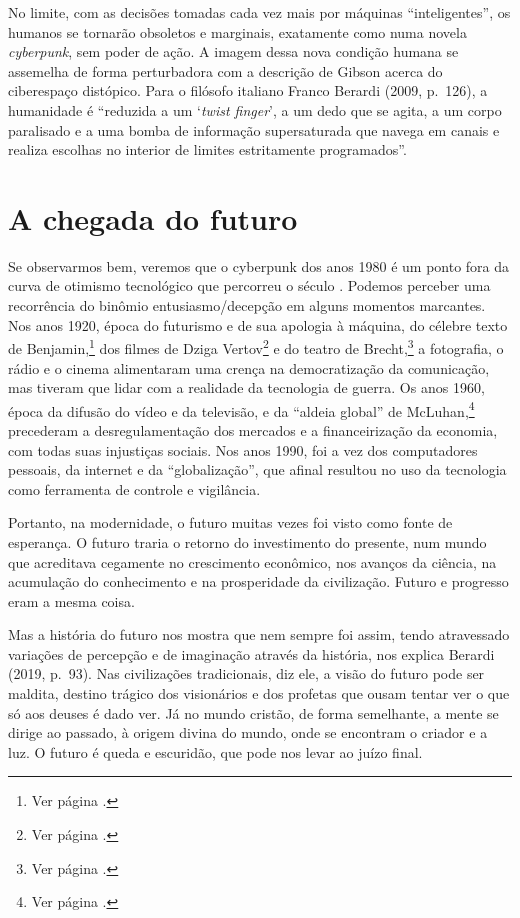 No limite, com as decisões tomadas cada vez mais por máquinas
``inteligentes'', os humanos se tornarão obsoletos e marginais,
exatamente como numa novela \emph{cyberpunk}, sem poder de ação. A imagem dessa
nova condição humana se assemelha de forma perturbadora com a descrição
de Gibson acerca do ciberespaço distópico. Para o filósofo italiano
Franco Berardi (2009, p.~126), a humanidade é ``reduzida a um `\emph{twist finger}', a um dedo que se agita, a um corpo paralisado e a uma bomba de
informação supersaturada que navega em canais e realiza escolhas no
interior de limites estritamente programados''.

\chapter{A chegada do futuro}

Se observarmos bem, veremos que o cyberpunk dos anos 1980 é um ponto fora da curva de otimismo tecnológico que percorreu o século . Podemos perceber uma recorrência do binômio entusiasmo/decepção em alguns momentos marcantes. Nos anos 1920, época do futurismo e de sua apologia à máquina, do célebre texto de Benjamin,\footnote{Ver página \pageref{benjamin}.} dos filmes de Dziga Vertov\footnote{Ver página \pageref{vertov}.} e do teatro de Brecht,\footnote{Ver página \pageref{brecht}.} a fotografia, o rádio e o cinema alimentaram uma crença na democratização da comunicação, mas tiveram que lidar com a realidade da tecnologia de guerra. Os anos 1960, época da difusão do vídeo e da televisão, e da ``aldeia global'' de McLuhan,\footnote{Ver página \pageref{mcluhan}.} precederam a desregulamentação dos mercados e a financeirização da economia, com todas suas injustiças sociais. Nos anos 1990, foi a vez dos computadores pessoais, da internet e da ``globalização'', que afinal resultou no uso da tecnologia como ferramenta de controle e vigilância. 

Portanto, na modernidade, o futuro muitas vezes foi visto como fonte de esperança. O futuro
traria o retorno do investimento do presente, num mundo que acreditava
cegamente no crescimento econômico, nos avanços da ciência, na
acumulação do conhecimento e na prosperidade da civilização. Futuro e
progresso eram a mesma coisa.

Mas a história do futuro nos mostra que nem sempre foi assim, tendo
atravessado variações de percepção e de imaginação através da história,
nos explica Berardi (2019, p.~93). Nas civilizações tradicionais, diz ele, a visão do futuro pode ser maldita, destino trágico dos visionários
e dos profetas que ousam tentar ver o que só aos deuses é dado ver. Já
no mundo cristão, de forma semelhante, a mente se dirige ao passado, à origem divina do
mundo, onde se encontram o criador e a luz. O futuro é queda e escuridão,
que pode nos levar ao juízo final.


